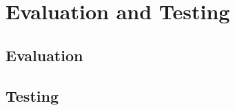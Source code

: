\chapter{Evaluation and Testing}
\label{chapter:evaluation-and-testing}



\section{Evaluation}
\label{sec:evaluation}



\section{Testing}
\label{sec:testing}

